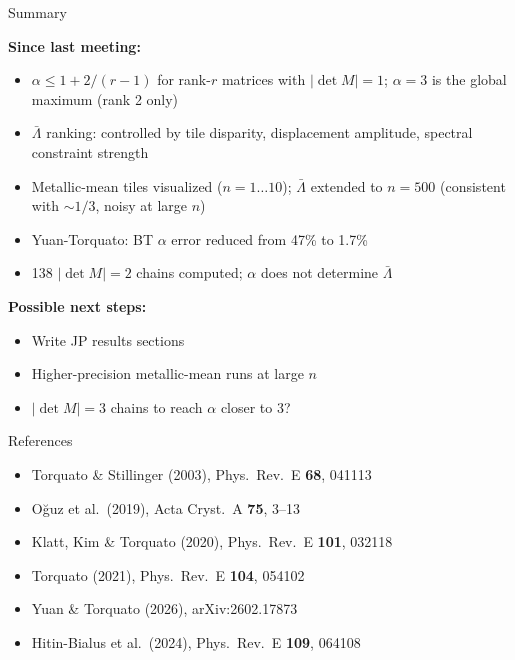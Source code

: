 \documentclass[aspectratio=169, 11pt]{beamer}
\begin{document}
\begin{frame}[shrink=5]{Summary}

\textbf{Since last meeting:}
\begin{itemize}
  \item $\alpha \leq 1 + 2/(r{-}1)$ for rank-$r$ matrices with $|\det M|{=}1$;
        $\alpha{=}3$ is the global maximum (rank 2 only)
  \item $\bar\Lambda$ ranking: controlled by tile disparity, displacement amplitude,
        spectral constraint strength
  \item Metallic-mean tiles visualized ($n{=}1\ldots10$);
        $\bar\Lambda$ extended to $n{=}500$ (consistent with ${\sim}1/3$, noisy at large $n$)
  \item Yuan-Torquato: BT $\alpha$ error reduced from 47\% to 1.7\%
  \item 138 $|\det M|{=}2$ chains computed; $\alpha$ does not determine $\bar\Lambda$
\end{itemize}

\vspace{0.5em}
\textbf{Possible next steps:}
\begin{itemize}
  \item Write JP results sections
  \item Higher-precision metallic-mean runs at large $n$
  \item $|\det M| = 3$ chains to reach $\alpha$ closer to 3?
\end{itemize}
\end{frame}
\note{
}

\begin{frame}{References}
\small
\begin{itemize}
  \item Torquato \& Stillinger (2003), Phys.\ Rev.\ E \textbf{68}, 041113
  \item O\u{g}uz et al.\ (2019), Acta Cryst.\ A \textbf{75}, 3--13
  \item Klatt, Kim \& Torquato (2020), Phys.\ Rev.\ E \textbf{101}, 032118
  \item Torquato (2021), Phys.\ Rev.\ E \textbf{104}, 054102
  \item Yuan \& Torquato (2026), arXiv:2602.17873
  \item Hitin-Bialus et al.\ (2024), Phys.\ Rev.\ E \textbf{109}, 064108
\end{itemize}
\end{frame}
\note{}
\end{document}
